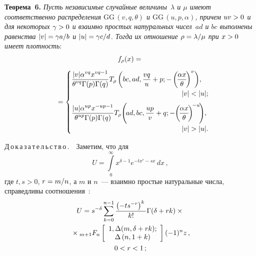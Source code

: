 \begin{multicols}{2}
\smallskip

\noindent
\textbf{Теорема~6.}
\textit{Пусть независимые случайные величины~$\lambda$ и $\mu$ 
имеют соответственно распределения $\mathrm{GG}\,(v,q,\theta)$ и $\mathrm{GG}\,(u,p,\alpha)$, 
причем  $uv\hm>0$ и для некоторых $\gamma\hm>0$ и взаимно простых натуральных чисел~$ad$ и $bc$ 
выполнены равенства $|v| \hm= \gamma a/b$ и $|u| \hm = \gamma c/d$. 
Тогда их отношение $\rho\hm=\lambda/\mu$ при $x\hm>0$ имеет плотность}:
\begin{multline*}
 f_\rho(x) ={}\\[6pt]
 {}=
 \begin{cases}
   \displaystyle \fr{|v|\alpha^{vq} x^{vq-1}}{\theta^{vq}\Gamma(p)\Gamma(q)}T_\rho
   \left(bc,ad,\fr{vq}{u}+p ;-\left(\!\fr{\alpha x} {\theta}\!\right)^{v}\right)\!, &\\[6pt]
   &\hspace*{-16mm}|v|<|u|;\\[6pt]
   \displaystyle\fr{|u| \alpha^{up}x^{-up-1}}{\theta^{up}\Gamma(p)\Gamma(q)}T_\rho
   \!\left(\!ad,bc,\fr{up}{v}+q ;-\!\left(\!\fr{\alpha x} {\theta}\!\right)^{\!-u}\!\right)\!, &\\[6pt]
   &\hspace*{-16mm}|v|>|u|.
 \end{cases}\hspace*{-13.30913pt}
 \end{multline*}


\noindent
Д\,о\,к\,а\,з\,а\,т\,е\,л\,ь\,с\,т\,в\,о\,.\ \
Заметим, что для
\begin{equation*}
U=\int\limits_0^\infty x^{\delta-1}e^{-tx^r-sx}\,dx\,,
\end{equation*}
где $t,s>0$, $r=\hm m/n$, а $m$ и $n$~--- 
взаимно простые натуральные числа, справедливы соотношения~\cite{Prudnikov1}:
\begin{multline} 
U = s^{-\delta}\sum\limits_{k=0}^{n-1}\fr{\left(-ts^{-r}\right)^k}{k!}\Gamma(\delta + rk)\times{}\\
{}\times
    {}_{m+1}F_{n}\left[\begin{array}{c}
    1, \Delta(m,\delta + rk);\\
    \Delta\left(n, 1+k\right)
    \end{array}\right] %
    (-1)^n z\,, %
    \\
     0<r<1\,; 
    \label{GGF_pos_les}
    \end{multline}
    
    \vspace*{-12pt}
    

\end{multicols}
